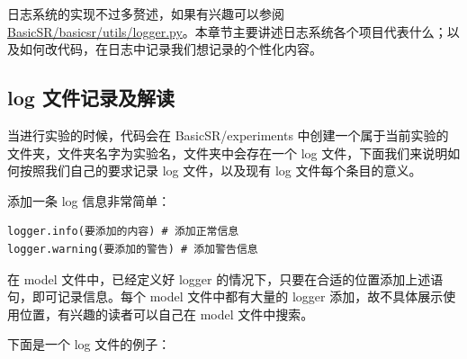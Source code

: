\documentclass[../main.tex]{subfiles}
\begin{document}
日志系统的实现不过多赘述，如果有兴趣可以参阅 \href{https://github.com/XPixelGroup/BasicSR/blob/master/basicsr/utils/logger.py}{BasicSR/basicsr/utils/logger.py}。本章节主要讲述日志系统各个项目代表什么；以及如何改代码，在日志中记录我们想记录的个性化内容。

\subsection{log 文件记录及解读}

当进行实验的时候，代码会在 BasicSR/experiments 中创建一个属于当前实验的文件夹，文件夹名字为实验名，文件夹中会存在一个 log 文件，下面我们来说明如何按照我们自己的要求记录 log 文件，以及现有 log 文件每个条目的意义。

\begin{hl} %

添加一条 log 信息非常简单：

\begin{verbatim}
logger.info(要添加的内容) # 添加正常信息
logger.warning(要添加的警告) # 添加警告信息
\end{verbatim}
\end{hl}

在 model 文件中，已经定义好 logger 的情况下，只要在合适的位置添加上述语句，即可记录信息。每个 model 文件中都有大量的 logger 添加，故不具体展示使用位置，有兴趣的读者可以自己在 model 文件中搜索。

下面是一个 log 文件的例子：
\end{document}
